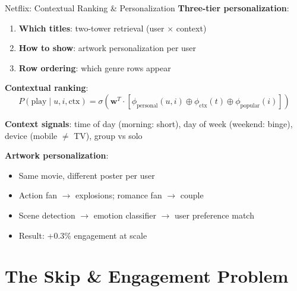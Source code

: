 \documentclass[aspectratio=169, 11pt]{beamer}
\begin{document}
\begin{frame}{Netflix: Contextual Ranking \& Personalization}
\small
\textbf{Three-tier personalization}:
\begin{enumerate}
    \item \textbf{Which titles}: two-tower retrieval (user $\times$ context)
    \item \textbf{How to show}: artwork personalization per user
    \item \textbf{Row ordering}: which genre rows appear
\end{enumerate}

\vspace{0.15cm}
\textbf{Contextual ranking}:
\begin{equation*}
P(\text{play} \mid u, i, \text{ctx}) = \sigma(\mathbf{w}^T \cdot [\phi_{\text{personal}}(u,i) \oplus \phi_{\text{ctx}}(t) \oplus \phi_{\text{popular}}(i)])
\end{equation*}

\vspace{0.1cm}
\textbf{Context signals}: time of day (morning: short), day of week (weekend: binge), device (mobile $\neq$ TV), group vs solo

\vspace{0.15cm}
\textbf{Artwork personalization}:
\begin{itemize}
    \item Same movie, different poster per user
    \item Action fan $\to$ explosions; romance fan $\to$ couple
    \item Scene detection $\to$ emotion classifier $\to$ user preference match
    \item Result: +0.3\% engagement at scale
\end{itemize}
\end{frame}

\section{The Skip \& Engagement Problem}
\end{document}
